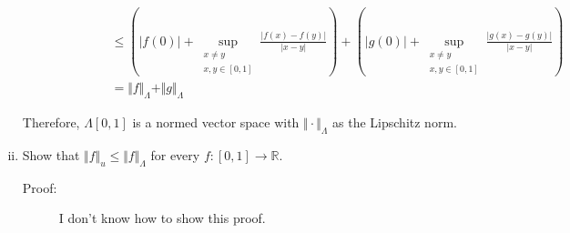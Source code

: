 \documentclass[10pt]{extarticle}
\newcommand{\R}{\mathbb{R}}
\begin{document}
\begin{enumerate}[(i)]
\begin{description}
\begin{description}
\begin{align*}
                                  &\leq \left(|f(0)| + \sup_{\substack{x\neq y\\ x,y\in[0,1]}}\frac{|f(x)-f(y)|}{|x-y|}\right)+ \left(|g(0)| + \sup_{\substack{x\neq y\\ x,y\in[0,1]}}\frac{|g(x)-g(y)|}{|x-y|}\right)\\
                                  &= \Vert f\Vert_{\Lambda} + \Vert g \Vert_{\Lambda}
              \end{align*}
          \end{description}
      \end{description}
      Therefore, $\Lambda[0,1]$ is a normed vector space with $\Vert \cdot \Vert_{\Lambda}$ as the Lipschitz norm.
    \item Show that $\Vert f\Vert_u \leq \Vert f \Vert_{\Lambda}$ for every $f:[0,1]\rightarrow \R$.
      \begin{description}
        \item[Proof:] I don't know how to show this proof.
      \end{description}
  \end{enumerate}
\end{document}
